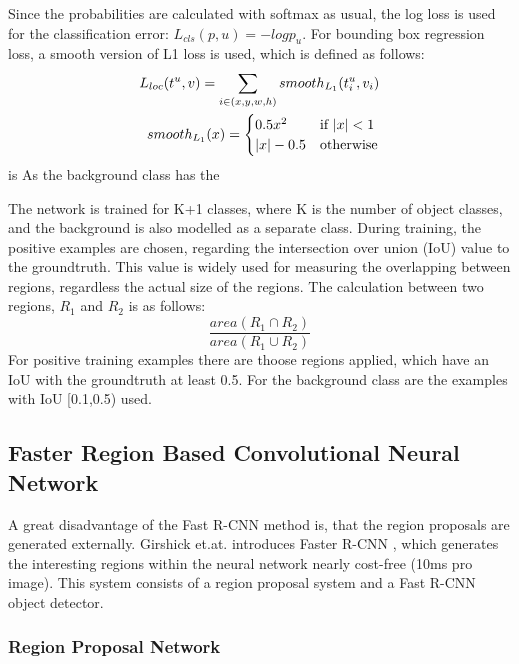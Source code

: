 Since the probabilities are calculated with softmax as usual, the log loss is used for the classification error: $L_{cls}(p,u) = -logp_u$. For bounding box regression loss, a smooth version of L1 loss is used, which is defined as follows:
\begin{align}\label{eq:c-smoothl1loss}
	L_{loc}(t^u, v) = \sum\limits_{i \in (x, y, w, h)} smooth_{L_{1}} (t_{i}^u, v_i)\\
	smooth_{L_{1}} (x) = \begin{cases}
               0.5 x^2 & \text{if } \lvert x\rvert < 1\\
               \lvert x\rvert-0.5 & \text{otherwise}
            \end{cases}
\end{align}
 is As the background class has the 

The network is trained for K+1 classes, where K is the number of object classes, and the background is also modelled as a separate class. During training, the positive examples are chosen, regarding the intersection over union (IoU) value to the groundtruth. This value is widely used for measuring the overlapping between regions, regardless the actual size of the regions. The calculation between two regions, $R_1$ and $R_2$ is as follows:
\begin{equation}\label{eq:c-iou}
        \frac{area ( R_1 \cap R_2 )}{area ( R_1 \cup R_2 )}
\end{equation}
For positive training examples there are thoose regions applied, which have an IoU with the groundtruth at least 0.5. For the background class are the examples with IoU [0.1,0.5) used.

\subsection{Faster Region Based Convolutional Neural Network}\label{s:c-fasterrcnn}

A great disadvantage of the Fast R-CNN method is, that the region proposals are generated externally. Girshick et.at. introduces Faster R-CNN \cite{NIPS2015_5638}, which generates the interesting regions within the neural network nearly cost-free (10ms pro image). This system consists of a region proposal system and a Fast R-CNN object detector.

\subsubsection{Region Proposal Network}

